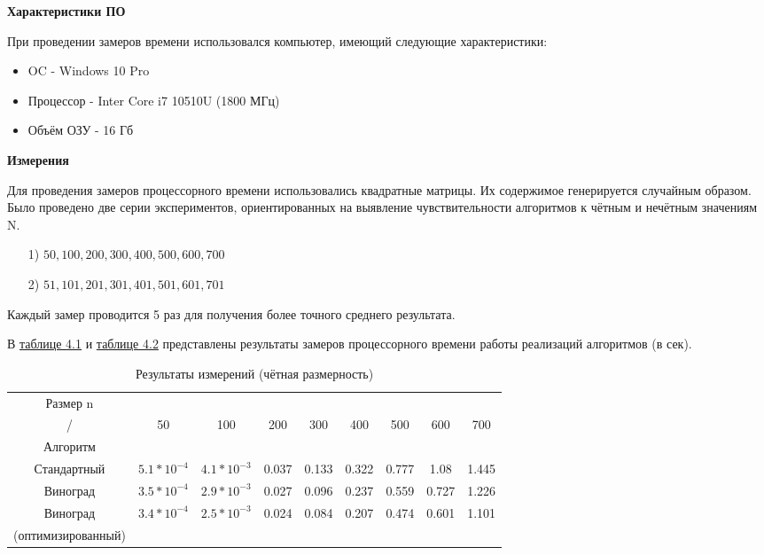 \textbf{Характеристики ПО}

При проведении замеров времени использовался компьютер, имеющий следующие характеристики:
\begin{itemize}
	\item OC - Windows 10 Pro
	\item Процессор - Inter Core i7 10510U (1800 МГц)
	\item Объём ОЗУ - 16 Гб
\end{itemize}

\textbf{Измерения}

Для проведения замеров процессорного времени использовались квадратные матрицы. Их содержимое генерируется случайным образом. Было проведено две серии экспериментов, ориентированных на выявление чувствительности алгоритмов к чётным и нечётным значениям N.
\begin{itemize}
	\item[1)] ${50, 100, 200, 300, 400, 500, 600, 700}$
	\item[2)] ${51, 101, 201, 301, 401, 501, 601, 701}$
\end{itemize} 

Каждый замер проводится 5 раз для получения более точного среднего результата.

В \hyperref[table_4_1]{таблице 4.1} и \hyperref[table_4_2]{таблице 4.2} представлены результаты замеров процессорного времени работы реализаций алгоритмов (в сек).

\begin{table}[ph] \label{table_4_1}
	\caption{Результаты измерений (чётная размерность)}
	\centering
	\begin{tabular}{|c|c|c|c|c|c|c|c|c|}
		\hline
		Размер n&&&&&&&&\\
		/    &50 &100 & 200 & 300 & 400 & 500 & 600 & 700\\
		Алгоритм    &&&&&&&&\\
		\hline
		Стандартный & $5.1*10^{-4}$ & $4.1*10^{-3}$ & 0.037 & 0.133 & 0.322 & 0.777 & 1.08 & 1.445 \\
		\hline
		Виноград & $3.5*10^{-4}$ & $2.9*10^{-3}$ & 0.027 & 0.096 & 0.237 & 0.559 & 0.727 & 1.226\\
		\hline
		Виноград & $3.4*10^{-4}$ & $2.5*10^{-3}$ & 0.024 & 0.084 & 0.207 & 0.474 & 0.601 & 1.101\\
		(оптимизированный) &&&&&&&&\\
		\hline
	\end{tabular}
\end{table}

